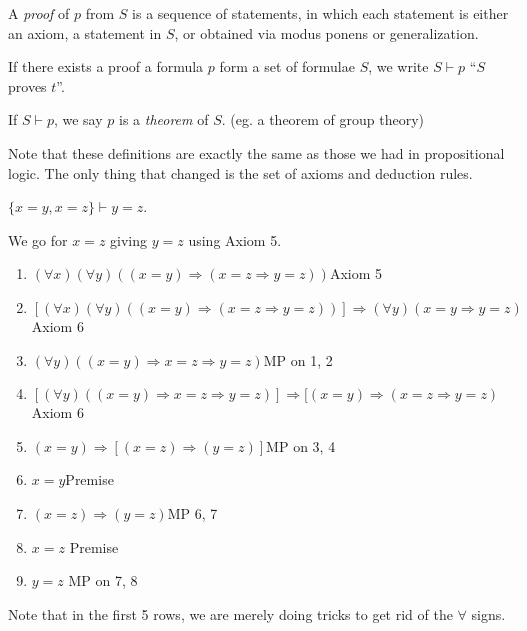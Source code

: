 \documentclass[a4paper]{article}
\begin{document}
\begin{defi}[Proof]
  A \emph{proof} of $p$ from $S$ is a sequence of statements, in which each statement is either an axiom, a statement in $S$, or obtained via modus ponens or generalization.
\end{defi}
\begin{defi}
  If there exists a proof a formula $p$ form a set of formulae $S$, we write $S\vdash p$ ``$S$ proves $t$''.
\end{defi}

\begin{defi}[Theorem]
  If $S\vdash p$, we say $p$ is a \emph{theorem} of $S$. (eg. a theorem of group theory)
\end{defi}

Note that these definitions are exactly the same as those we had in propositional logic. The only thing that changed is the set of axioms and deduction rules.

\begin{eg}
  $\{x = y, x = z\}\vdash y = z$.

  We go for $x = z$ giving $y = z$ using Axiom 5.

  \begin{enumerate}[label=\arabic{*}.]
    \item $(\forall x)(\forall y)((x = y)\Rightarrow (x = z\Rightarrow y=z))$\hfill Axiom 5
    \item $[(\forall x)(\forall y)((x = y)\Rightarrow (x = z\Rightarrow y=z))]\Rightarrow (\forall y)(x = y\Rightarrow y = z)$ \hfill Axiom 6
    \item $(\forall y)((x = y) \Rightarrow  x = z \Rightarrow  y = z)$\hfill MP on 1, 2
    \item $[(\forall y)((x = y) \Rightarrow  x = z \Rightarrow  y = z)]\Rightarrow [(x = y)\Rightarrow (x = z\Rightarrow y = z)$\hfill Axiom 6
    \item $(x = y) \Rightarrow  [(x = z) \Rightarrow  (y = z)]$\hfill MP on 3, 4
    \item $x = y$\hfill Premise
    \item $(x = z) \Rightarrow  (y = z)$\hfill MP 6, 7
    \item $x = z$ \hfill Premise
    \item $y = z$ \hfill MP on 7, 8
  \end{enumerate}

  Note that in the first 5 rows, we are merely doing tricks to get rid of the $\forall$ signs.
\end{eg}
\end{document}
